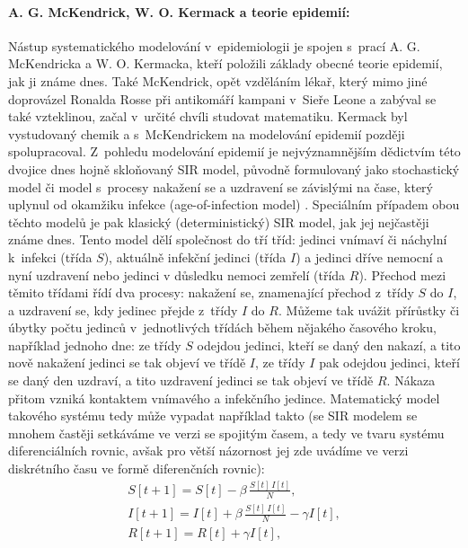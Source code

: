 
\paragraph{A. G. McKendrick, W. O. Kermack a teorie epidemií:} Nástup systematického modelování v~epidemiologii je spojen s~prací A. G. McKendricka a W. O. Kermacka, kteří položili základy obecné teorie epidemií, jak ji známe dnes. Také McKendrick, opět vzděláním lékař, který mimo jiné doprovázel Ronalda Rosse při antikomáří kampani v~Sieře Leone a zabýval se také vzteklinou, začal v~určité chvíli studovat matematiku. Kermack byl vystudovaný chemik a s~McKendrickem na modelování epidemií později spolupracoval. Z~pohledu modelování epidemií je nejvýznamnějším dědictvím této dvojice dnes hojně skloňovaný SIR model, původně formulovaný jako stochastický model \cite{McKendrick1925} či model s~procesy nakažení se a uzdravení se závislými na čase, který uplynul od okamžiku infekce (age-of-infection model) \cite{McKendrickKermack1927,YangBrauer2008}. Spe\-ci\-ál\-ním případem obou těchto modelů je pak klasický (deterministický) SIR model, jak jej nejčastěji známe dnes. Tento model dělí společnost do tří tříd: jedinci vnímaví či náchylní k~infekci (třída $S$), aktuálně infekční jedinci (třída $I$) a jedinci dříve nemocní a nyní uzdravení nebo jedinci v důsledku nemoci zemřelí (třída $R$). Přechod mezi těmito třídami řídí dva procesy: nakažení se, znamenající přechod z~třídy $S$ do $I$, a uzdravení se, kdy jedinec přejde z~třídy $I$ do $R$. Můžeme tak uvážit přírůstky či úbytky počtu jedinců v~jednotlivých třídách během nějakého časového kroku, například jednoho dne: ze třídy $S$ odejdou jedinci, kteří se daný den nakazí, a tito nově nakažení jedinci se tak objeví ve třídě $I$, ze třídy $I$ pak odejdou jedinci, kteří se daný den uzdraví, a tito uzdravení jedinci se tak objeví ve třídě $R$. Nákaza přitom vzniká kontaktem vnímavého a infekčního jedince. Matematický model takového systému tedy může vypadat například takto (se SIR modelem se mnohem častěji setkáváme ve verzi se spojitým časem, a tedy ve tvaru systému diferenciálních rovnic, avšak pro větší názornost jej zde uvádíme ve verzi diskrétního času ve formě diferenčních rovnic):
\begin{equation}
\begin{array}{l}
\displaystyle{S[t+1] = S[t] - \beta \, \frac{S[t]\,I[t]}{N}}, \\[3ex]
\displaystyle{I[t+1] = I[t] + \beta \, \frac{S[t]\,I[t]}{N} - \gamma I[t]}, \\[3ex]
\displaystyle{R[t+1] = R[t] + \gamma I[t]},
\end{array}
\label{SIR1}
\end{equation}
